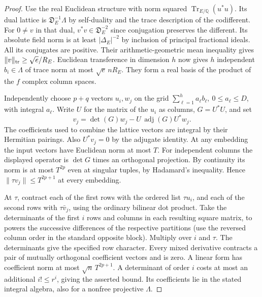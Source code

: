 \begin{proof}
Use the real Euclidean structure with norm squared
\(\operatorname{Tr}_{E/\mathbb Q}(u^*u)\). Its dual lattice is
\(\mathfrak D_E^{-1}\Lambda\) by self-duality and the trace
description of the codifferent. For \(0\ne v\) in that dual,
\(v^*v\in\mathfrak D_E^{-2}\) since conjugation preserves the
different. Its absolute field norm is at least
\(|\Delta_E|^{-2}\) by inclusion of principal fractional ideals.
All its conjugates are positive. Their arithmetic-geometric mean
inequality gives \(\|v\|_{\rm tr}\ge\sqrt e/R_E\). Euclidean
transference in dimension \(h\) now gives \(h\) independent
\(b_i\in\Lambda\) of trace norm at most \(\sqrt e\,nR_E\).
They form a real basis of the product of the \(f\) complex
column spaces. \cite[Theorem~2.1]{banaszczyk}

Independently choose \(p+q\) vectors \(u_i,w_j\) on the grid
\(\sum_{\ell=1}^h a_\ell b_\ell,\ 0\le a_\ell\le D\),
with integral \(a_\ell\). Write \(U\) for the matrix of the \(u_i\)
as columns, \(G=U^*U\), and set
\[
       v_j=\det(G)w_j-U\,\operatorname{adj}(G)U^*w_j .
\]
The coefficients used to combine the lattice vectors are integral
by their Hermitian pairings. Also \(U^*v_j=0\) by the adjugate
identity. At any embedding the input vectors have Euclidean norm
at most \(T\). For independent columns the displayed operator is
\(\det G\) times an orthogonal projection. By continuity its norm
is at most \(T^{2p}\) even at singular tuples, by Hadamard's
inequality. Hence \(\|\tau v_j\|\le T^{2p+1}\) at every embedding.

At \(\tau\), contract each of the first rows with the ordered list
\(\tau u_i\), and each of the second rows with \(\tau\bar v_j\),
using the ordinary bilinear dot product. Take the determinants of
the first \(i\) rows and columns in each resulting square matrix,
to powers the successive differences of the respective partitions
(use the reversed column order in the standard opposite block).
Multiply over \(i\) and \(\tau\). The determinants give the
specified row character. Every mixed derivative contracts a pair
of mutually orthogonal coefficient vectors and is zero. A linear
form has coefficient norm at most \(\sqrt n\,T^{2p+1}\).
A determinant of order \(i\) costs at most an additional \(i!\le
r^i\), giving the asserted bound. Its coefficients lie in the
stated integral algebra, also for a nonfree projective \(\Lambda\).


\end{proof}
